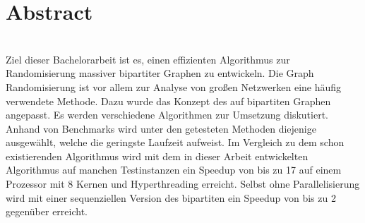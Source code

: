 \chapter*{Abstract}


~\\

Ziel dieser Bachelorarbeit ist es, einen effizienten Algorithmus
zur Randomisierung massiver bipartiter Graphen zu entwickeln.
Die Graph Randomisierung ist vor allem zur Analyse von großen Netzwerken eine häufig verwendete Methode.
 Dazu 
wurde das Konzept des \gc{} auf bipartiten Graphen
angepasst. Es werden verschiedene Algorithmen zur Umsetzung diskutiert.
Anhand von Benchmarks wird unter den getesteten Methoden diejenige ausgewählt,
welche die geringste Laufzeit aufweist.
Im Vergleich zu dem schon existierenden \cb{} Algorithmus 
wird mit dem in dieser Arbeit entwickelten Algorithmus 
auf manchen Testinstanzen ein Speedup von bis zu 17 auf einem Prozessor mit 8 Kernen und Hyperthreading 
erreicht. Selbst ohne Parallelisierung wird mit einer sequenziellen Version des bipartiten \gc{} ein Speedup
von bis zu 2 gegenüber \cb{} erreicht.



